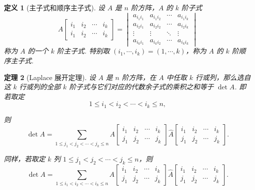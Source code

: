 \documentclass[10pt,openany]{article}
\theoremstyle{thmstyle} %
\newtheorem{theorem}{定理}[subsection]
\theoremstyle{defstyle} %
\newtheorem{definition}[theorem]{定义}
\theoremstyle{prostyle} %
\theoremstyle{exastyle}
\theoremstyle{remstyle}
\begin{document}
\begin{definition}[主子式和顺序主子式]
	设 \( A \) 是 \( n \) 阶方阵，\( A \) 的 \( k \) 阶子式
	\[
	A\begin{bmatrix}
		i_1 & i_2 & \cdots & i_k \\
		i_1 & i_2 & \cdots & i_k
	\end{bmatrix}
	= \begin{vmatrix}
		a_{i_1 i_1} & a_{i_1 i_2} & \cdots & a_{i_1 i_k} \\
		a_{i_2 i_1} & a_{i_2 i_2} & \cdots & a_{i_2 i_k} \\
		\vdots & \vdots & \ddots & \vdots \\
		a_{i_k i_1} & a_{i_k i_2} & \cdots & a_{i_k i_k}
	\end{vmatrix}
	\]
	称为 \( A \) 的一个 \( k \) 阶主子式. 特别取 \( (i_1,\cdots,i_k)=(1,\cdots,k) \)，称为 \( A \) 的 \( k \) 阶顺序主子式.
\end{definition}

\begin{theorem}[Laplace 展开定理] \label{2.4.3}
	设 \( A \) 是 \( n \) 阶方阵，在 \( A \) 中任取 \( k \) 行或列，那么选自这 \( k \) 行或列的全部 \( k \) 阶子式与它们对应的代数余子式的乘积之和等于 \( \det A \). 即若取定
	\[
	1 \leq i_1 < i_2 < \cdots < i_k \leq n,
	\]
	
	则
	\begin{equation}
		\det A = \sum_{1 \leq j_1 < j_2 < \cdots < j_k \leq n}
		A\begin{bmatrix}
			i_1 & i_2 & \cdots & i_k \\
			j_1 & j_2 & \cdots & j_k
		\end{bmatrix}
		\hat{A}\begin{bmatrix}
			i_1 & i_2 & \cdots & i_k \\
			j_1 & j_2 & \cdots & j_k
		\end{bmatrix}.
		\label{equ2.4.2}
	\end{equation}

	同样，若取定 \( k \) 列 \( 1 \leq j_1 < j_2 < \cdots < j_k \leq n \)，则
	\begin{equation}
		\det A = \sum_{1 \leq i_1 < i_2 < \cdots < i_k \leq n}
		A\begin{bmatrix}
			i_1 & i_2 & \cdots & i_k \\
			j_1 & j_2 & \cdots & j_k
		\end{bmatrix}
		\hat{A}\begin{bmatrix}
			i_1 & i_2 & \cdots & i_k \\
			j_1 & j_2 & \cdots & j_k
		\end{bmatrix}.
		\label{equ2.4.3}
	\end{equation}
\end{theorem}
\end{document}
